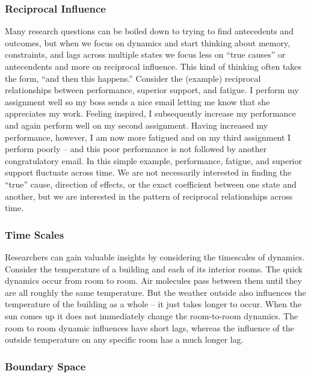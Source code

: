 \documentclass[english,,man]{apa6}
\theoremstyle{definition}
\theoremstyle{definition}
\theoremstyle{definition}
\theoremstyle{remark}
\begin{document}
\hypertarget{reciprocal-influence}{%
\subsubsection{Reciprocal Influence}\label{reciprocal-influence}}

Many research questions can be boiled down to trying to find antecedents
and outcomes, but when we focus on dynamics and start thinking about
memory, constraints, and lags across multiple states we focus less on
\enquote{true causes} or antecendents and more on reciprocal influence.
This kind of thinking often takes the form, \enquote{and then this
happens.} Consider the (example) reciprocal relationships between
performance, superior support, and fatigue. I perform my assignment well
so my boss sends a nice email letting me know that she appreciates my
work. Feeling inspired, I subsequently increase my performance and again
perform well on my second assignment. Having increased my performance,
however, I am now more fatigued and on my third assignment I perform
poorly -- and this poor performance is not followed by another
congratulatory email. In this simple example, performance, fatigue, and
superior support fluctuate across time. We are not necessarily
interested in finding the \enquote{true} cause, direction of effects, or
the exact coefficient between one state and another, but we are
interested in the pattern of reciprocal relationships across time.

\hypertarget{time-scales}{%
\subsubsection{Time Scales}\label{time-scales}}

Researchers can gain valuable insights by considering the timescales of
dynamics. Consider the temperature of a building and each of its
interior rooms. The quick dynamics occur from room to room. Air
molecules pass between them until they are all roughly the same
temperature. But the weather outside also influences the temperature of
the building as a whole -- it just takes longer to occur. When the sun
comes up it does not immediately change the room-to-room dynamics. The
room to room dynamic influences have short lags, whereas the influence
of the outside temperature on any specific room has a much longer lag.

\hypertarget{boundary-space}{%
\subsubsection{Boundary Space}\label{boundary-space}}
\end{document}

